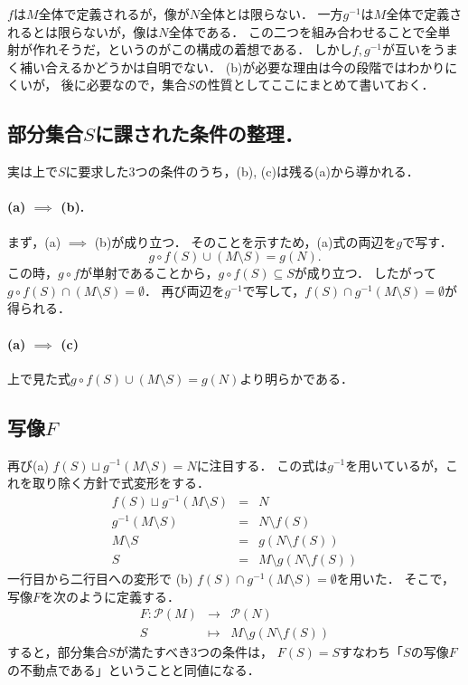 \documentclass[a4j, 10pt]{jarticle}
\begin{document}
    $f$は$M$全体で定義されるが，像が$N$全体とは限らない．
    一方$g^{-1}$は$M$全体で定義されるとは限らないが，像は$N$全体である．
    この二つを組み合わせることで全単射が作れそうだ，というのがこの構成の着想である．
    しかし$f, g^{-1}$が互いをうまく補い合えるかどうかは自明でない．
    (b)が必要な理由は今の段階ではわかりにくいが，
    後に必要なので，集合$S$の性質としてここにまとめて書いておく．

    \subsection{部分集合$S$に課された条件の整理．}
    実は上で$S$に要求した3つの条件のうち，(b), (c)は残る(a)から導かれる．

    \paragraph{(a) $\implies$ (b).}
    まず，(a) $\implies$ (b)が成り立つ．
    そのことを示すため，(a)式の両辺を$g$で写す．
    \[ g \circ f(S) \cup (M \setminus S)=g(N). \]
    この時，$g \circ f$が単射であることから，$g \circ f(S) \subseteq S$が成り立つ．
    したがって$g \circ f(S) \cap (M \setminus S)=\emptyset$．
    再び両辺を$g^{-1}$で写して，$f(S) \cap g^{-1}(M \setminus S)=\emptyset$が得られる．

    \paragraph{(a) $\implies$ (c)}
    上で見た式$g \circ f(S) \cup (M \setminus S)=g(N)$より明らかである．

    \subsection{写像$F$}
    再び(a) $f(S) \sqcup g^{-1}(M \setminus S)=N$に注目する．
    この式は$g^{-1}$を用いているが，これを取り除く方針で式変形をする．
    \begin{eqnarray*}
        f(S) \sqcup g^{-1}(M \setminus S)&=&N \\
        g^{-1}(M \setminus S)&=&N \setminus f(S) \\
        M \setminus S&=&g(N \setminus f(S)) \\
        S&=&M \setminus g(N \setminus f(S))
    \end{eqnarray*}
    一行目から二行目への変形で
    (b) $f(S) \cap g^{-1}(M \setminus S)=\emptyset$を用いた．
    そこで，写像$F$を次のように定義する．
    \begin{eqnarray*}
        F : \mathcal{P}(M) &\to& \mathcal{P}(N) \\
            S &\mapsto& M \setminus g(N \setminus f(S))
    \end{eqnarray*}
    すると，部分集合$S$が満たすべき3つの条件は，
    $F(S)=S$すなわち「$S$の写像$F$の不動点である」ということと同値になる．
\end{document}
